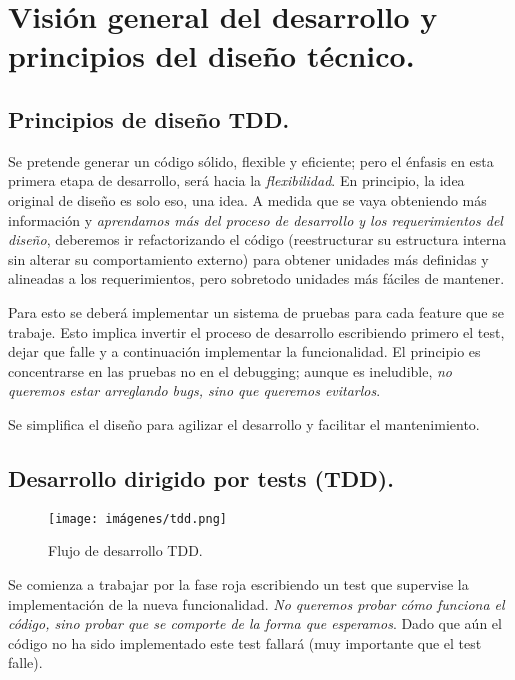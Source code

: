 
\section{Visión general del desarrollo y principios del diseño técnico.}\label{principios:vision-general-desarrollo}

\subsection{Principios de diseño TDD.}\label{principios:principios-de-diseno}
Se pretende generar un código sólido, flexible y eficiente; pero el énfasis en esta primera etapa de desarrollo, será hacia la \emph{flexibilidad}. En principio, la idea original de diseño es solo eso, una idea. A medida que se vaya obteniendo más información y \emph{aprendamos más del proceso de desarrollo y los requerimientos del diseño}, deberemos ir refactorizando el código (reestructurar su estructura interna sin alterar su comportamiento externo) para obtener unidades más definidas y alineadas a los requerimientos, pero sobretodo unidades más fáciles de mantener.

Para esto se deberá implementar un sistema de pruebas para cada feature que se trabaje. Esto implica invertir el proceso de desarrollo escribiendo primero el test, dejar que falle y a continuación implementar la funcionalidad. El principio es concentrarse en las pruebas no en el \foreignlanguage{english}{debugging}; aunque es ineludible, \emph{no queremos estar arreglando bugs, sino que queremos evitarlos}.

Se simplifica el diseño para agilizar el desarrollo y facilitar el mantenimiento.

\subsection{Desarrollo dirigido por tests (TDD).}\label{principios:TDD}

\begin{figure}[ht]
	\centering
	\texttt{[image: imágenes/tdd.png]}
	\caption{Flujo de desarrollo TDD.}
\end{figure}

Se comienza a trabajar por la fase roja escribiendo un test que supervise la implementación de la nueva funcionalidad. \emph{No queremos probar cómo funciona el código, sino probar que se comporte de la forma que esperamos}. Dado que aún el código no ha sido implementado este test fallará (muy importante que el test falle).

